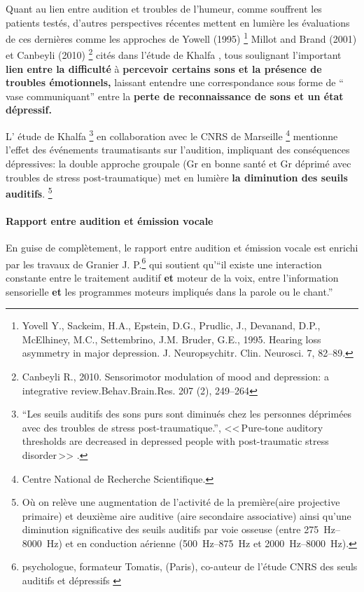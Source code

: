    

 
Quant au lien entre audition et troubles de l'humeur, comme souffrent
les patients testés, d'autres perspectives
récentes mettent en lumière les évaluations de ces dernières comme les
approches de Yowell (1995) \footnote{Yovell
  Y., Sackeim, H.A., Epstein, D.G., Prudlic, J., Devanand, D.P.,
  McElhiney, M.C., Settembrino, J.M. Bruder, G.E., 1995. Hearing loss
  asymmetry in major depression. J. Neuropsychitr. Clin. Neurosci. 7,
  82--89.} Millot and Brand (2001) et 
Canbeyli (2010) \footnote{Canbeyli R., 2010. Sensorimotor modulation of mood and
depression: a integrative review.Behav.Brain.Res. 207 (2), 249--264}
cités dans l'étude de Khalfa \autocite{affectiveDisorders}, tous soulignant l'important\textbf{ lien entre la difficulté}
à \textbf{percevoir certains sons et la présence de troubles émotionnels,}
laissant entendre une correspondance sous forme de `` vase communiquant''
entre la \textbf{perte de reconnaissance de
sons et un état dépressif.}

L' étude de Khalfa \footnote{``Les seuils auditifs des sons purs 
	sont diminués chez les personnes déprimées avec des
	troubles de stress post-traumatique.'', <<\,Pure-tone auditory 
	thresholds are decreased in depressed people with post-traumatic stress 
disorder\,>>
	.} \autocite{affectiveDisorders} en collaboration avec
le CNRS de Marseille \footnote{Centre National de Recherche Scientifique.}  mentionne l'effet des événements
traumatisants sur l'audition, impliquant des conséquences dépressives:
la double approche groupale (Gr en bonne santé et Gr déprimé avec
troubles de stress post-traumatique) met en lumière \textbf{la diminution des
  seuils auditifs}. %
\footnote{Où on relève une augmentation de l'activité de la
première(aire projective primaire)  et deuxième aire auditive (aire
secondaire associative) ainsi qu'une diminution significative des
seuils auditifs par voie osseuse (entre
\SIrange{275}{8000}{\Hz}) et en conduction aérienne
(\SIrange{500}{875}{\Hz} et  \SIrange{2000}{8000}{\Hz}).}

\paragraph{Rapport entre audition et émission vocale}

En guise de complètement, le rapport entre audition et émission vocale
est enrichi par les travaux de Granier J. P.\footnote{psychologue, formateur
Tomatis, (Paris), co-auteur de l'étude CNRS des seuls auditifs et
dépressifs \autocite{affectiveDisorders} }
qui soutient qu'``il existe une 
interaction
constante entre le traitement auditif \textbf{et} moteur de la
voix, entre l'information sensorielle \textbf{et} les programmes moteurs impliqués
dans la parole ou le chant.''



